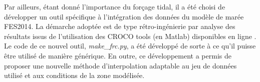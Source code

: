 \documentclass[10pt,a4paper,titlepage]{article}
\begin{document}
Par ailleurs, étant donné l'importance du forçage tidal, il a été choisi de développer un outil spécifique à l'intégration des données du modèle de marée FES2014.
La démarche adoptée est de type rétro-ingénierie par analyse des résultats issus de l'utilisation des CROCO tools (en Matlab) disponibles en ligne \parencite{croco_files_examples}.
Le code de ce nouvel outil, \textit{make\_frc.py}, a été développé de sorte à ce qu'il puisse être utilisé de manière générique.
En outre, ce développement a permis de proposer une nouvelle méthode d'interpolation adaptable au jeu de données utilisé et aux conditions de la zone modélisée.
\end{document}
